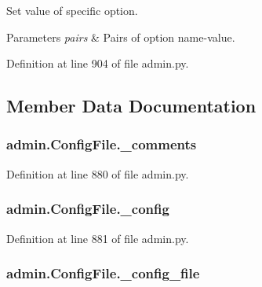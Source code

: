 Set value of specific option. 


\begin{DoxyParams}{Parameters}
{\em pairs} & Pairs of option name-\/value. \\
\hline
\end{DoxyParams}


Definition at line 904 of file admin.\-py.



\subsection{Member Data Documentation}
\hypertarget{classadmin_1_1ConfigFile_ac15829b16933412a7db88d3dacdcf345}{
\subsubsection[{\-\_\-comments}]{\setlength{\rightskip}{0pt plus 5cm}admin.\-Config\-File.\-\_\-comments\hspace{0.3cm}{\ttfamily [private]}}}\label{classadmin_1_1ConfigFile_ac15829b16933412a7db88d3dacdcf345}


Definition at line 880 of file admin.\-py.

\hypertarget{classadmin_1_1ConfigFile_a5a5c415d13ee87e1a03c9f64231a4fc9}{
\subsubsection[{\-\_\-config}]{\setlength{\rightskip}{0pt plus 5cm}admin.\-Config\-File.\-\_\-config\hspace{0.3cm}{\ttfamily [private]}}}\label{classadmin_1_1ConfigFile_a5a5c415d13ee87e1a03c9f64231a4fc9}


Definition at line 881 of file admin.\-py.

\hypertarget{classadmin_1_1ConfigFile_ada03146a25635d360b9994efcd3eb6ce}{
\subsubsection[{\-\_\-config\-\_\-file}]{\setlength{\rightskip}{0pt plus 5cm}admin.\-Config\-File.\-\_\-config\-\_\-file\hspace{0.3cm}{\ttfamily [private]}}}\label{classadmin_1_1ConfigFile_ada03146a25635d360b9994efcd3eb6ce}


